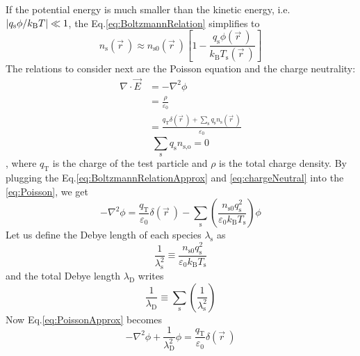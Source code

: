 If the potential energy is much smaller than the kinetic energy, i.e. $\abs{q_\text{s} \phi / k_\text{B} T}\ll 1$, the Eq.\ref{eq:BoltzmannRelation} simplifies to 
\begin{equation}
n_\text{s} \left(\vec{r} ~\right) \approx n_\text{s0} \left( \vec{r} ~\right) \left[ 1- \frac{q_\text{s} \phi \left( \vec{r} ~\right)}{k_\text{B} T_\text{s} \left( \vec{r} ~\right) }\right]
\label{eq:BoltzmannRelationApprox}
\end{equation}
The relations to consider next are the Poisson equation and the charge neutrality:
\begin{equation}
\begin{aligned}
\nabla \cdot \vec{E} &= - \nabla^2 \phi \\
&= \frac{\rho}{\varepsilon_0} \\
&= \frac{q_\text{T} \delta \left( \vec{r} ~\right) +\sum_\text{s} q_\text{s} n_\text{s} \left( \vec{r} ~\right)}{\varepsilon_0}
\end{aligned}
\label{eq:Poisson}
\end{equation}
\begin{equation}
\sum_\text{s} q_\text{s} n_\text{s,o} = 0
\label{eq:chargeNeutral}
\end{equation}
, where $q_\text{T}$ is the charge of the test particle and $\rho$ is the total charge density.
By plugging the Eq.\ref{eq:BoltzmannRelationApprox} and \ref{eq:chargeNeutral} into the \ref{eq:Poisson}, we get
\begin{equation}
- \nabla^2 \phi = \frac{q_\text{T}}{\varepsilon_0} \delta \left( \vec{r} ~\right) - \sum_\text{s} \left( \frac{n_\text{s0} q_\text{s}^2}{\varepsilon_0 k_\text{B} T_\text{s}} \right) \phi
\label{eq:PoissonApprox}
\end{equation}
Let us define the Debye length of each species $\lambda_\text{s}$ as
\begin{equation}
\frac{1}{\lambda_\text{s}^2} \equiv \frac{n_\text{s0} q_\text{s}^2}{\varepsilon_0 k_\text{B} T_\text{s}}
\end{equation}
and the total Debye length $\lambda_\text{D}$ writes
\begin{equation}
\frac{1}{\lambda_\text{D}} \equiv \sum_\text{s} \left( \frac{1}{\lambda_\text{s}^2} \right)
\end{equation}
Now Eq.\ref{eq:PoissonApprox} becomes
\begin{equation}
- \nabla^2 \phi + \frac{1}{\lambda_\text{D}^2} \phi = \frac{q_\text{T}}{\varepsilon_0} \delta \left( \vec{r} ~\right)
\label{eq:PoissonApproxSimplified}
\end{equation}
